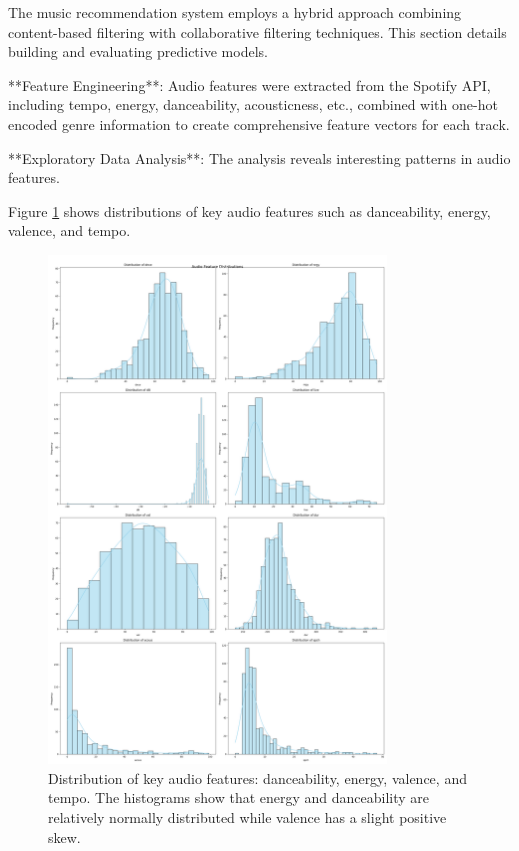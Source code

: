 \documentclass[runningheads]{llncs}
\begin{document}
The music recommendation system employs a hybrid approach combining content-based filtering with collaborative filtering techniques. This section details building and evaluating predictive models.

**Feature Engineering**: Audio features were extracted from the Spotify API, including tempo, energy, danceability, acousticness, etc., combined with one-hot encoded genre information to create comprehensive feature vectors for each track.

**Exploratory Data Analysis**: The analysis reveals interesting patterns in audio features.

Figure \ref{fig:audio_features} shows distributions of key audio features such as danceability, energy, valence, and tempo.

\begin{figure}[h]
    \centering
    \includegraphics[width=0.8\textwidth]{audio_feature_distribution.png} %
    \caption{Distribution of key audio features: danceability, energy, valence, and tempo. The histograms show that energy and danceability are relatively normally distributed while valence has a slight positive skew.}
    \label{fig:audio_features}
\end{figure}
\end{document}
